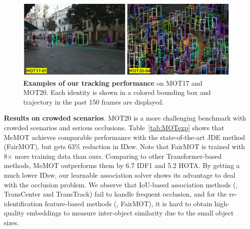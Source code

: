 \begin{figure}[t]
    \centering
    \includegraphics[width=0.99\linewidth]{figures/result3.pdf}
    \vspace{-1.5mm}
    \caption{
        \textbf{Examples of our tracking performance} on MOT17 and MOT20. Each identity is shown in a colored bounding box and trajectory in the past 150 frames are displayed.}
    \label{fig:vis_result}
    \vspace{-3.0mm}
\end{figure}

\vspace{-4pt}
\vspace{3pt} \noindent \textbf{Results on crowded scenarios}.
MOT20 is a more challenging benchmark with crowded scenarios and serious occlusions.
Table~\ref{tab:MOTexp} shows that MeMOT achieves comparable performance with the state-of-the-art JDE method (FairMOT), but gets 63\% reduction in IDsw.
Note that FairMOT is trained with 8$\times$ more training data than ours.
Comparing to other Transformer-based methods, MeMOT outperforms them by 6.7 IDF1 and 5.2 HOTA.
By getting a much lower IDsw, our learnable association solver shows its advantage to deal with the occlusion problem.
We observe that IoU-based association methods (\eg, TransCenter and TransTrack)
fail to handle frequent occlusion, and for the re-identification feature-based methods (\eg, FairMOT), it is hard to obtain high-quality embeddings to measure inter-object similarity due to the small object sizes.

